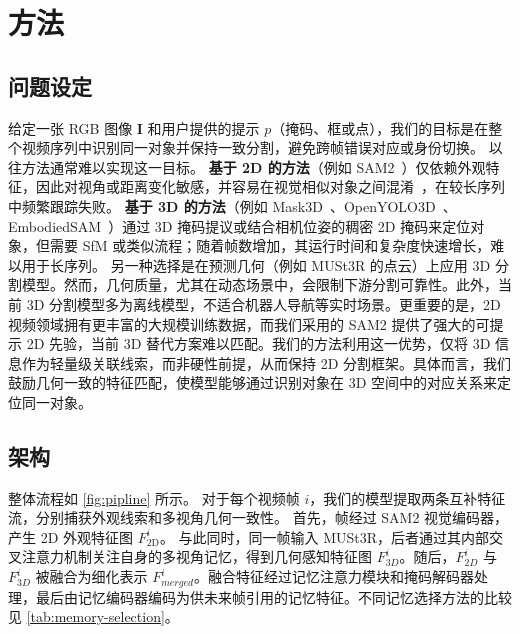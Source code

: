 \vspace{-1em}
\section{方法}
\label{sec:method}
\vspace{-0.5em}



\subsection{问题设定}
\vspace{-0.5em}
给定一张 RGB 图像 $\mathbf{I}$ 和用户提供的提示 $p$（掩码、框或点），我们的目标是在整个视频序列中识别同一对象并保持一致分割，避免跨帧错误对应或身份切换。
以往方法通常难以实现这一目标。
\textbf{基于 2D 的方法}（例如 SAM2~\cite{ravi2024sam2}）仅依赖外观特征，因此对视角或距离变化敏感，并容易在视觉相似对象之间混淆~\cite{videnovic2025distractor}，在较长序列中频繁跟踪失败。
\textbf{基于 3D 的方法}（例如 Mask3D~\cite{schult2022mask3d}、OpenYOLO3D~\cite{boudjoghra2024open}、EmbodiedSAM~\cite{xu2024esam}）通过 3D 掩码提议或结合相机位姿的稠密 2D 掩码来定位对象，但需要 SfM 或类似流程；随着帧数增加，其运行时间和复杂度快速增长，难以用于长序列。
另一种选择是在预测几何（例如 MUSt3R 的点云）上应用 3D 分割模型。然而，几何质量，尤其在动态场景中，会限制下游分割可靠性。此外，当前 3D 分割模型多为离线模型，不适合机器人导航等实时场景。更重要的是，2D 视频领域拥有更丰富的大规模训练数据，而我们采用的 SAM2 提供了强大的可提示 2D 先验，当前 3D 替代方案难以匹配。我们的方法利用这一优势，仅将 3D 信息作为轻量级关联线索，而非硬性前提，从而保持 2D 分割框架。具体而言，我们鼓励几何一致的特征匹配，使模型能够通过识别对象在 3D 空间中的对应关系来定位同一对象。


\vspace{-0.5em}
\subsection{架构}
\vspace{-0.5em}
整体流程如 \cref{fig:pipline} 所示。
对于每个视频帧 $i$，我们的模型提取两条互补特征流，分别捕获外观线索和多视角几何一致性。
首先，帧经过 SAM2 视觉编码器，产生 2D 外观特征图 $F_{\mathrm{2D}}^{i}$。
与此同时，同一帧输入 MUSt3R，后者通过其内部交叉注意力机制关注自身的多视角记忆，得到几何感知特征图 $F_{{3D}}^{i}$。随后，$F_{{2D}}^{i}$ 与 $F_{{3D}}^{i}$ 被融合为细化表示 $F_{{merged}}^{i}$。融合特征经过记忆注意力模块和掩码解码器处理，最后由记忆编码器编码为供未来帧引用的记忆特征。不同记忆选择方法的比较见 \cref{tab:memory-selection}。


